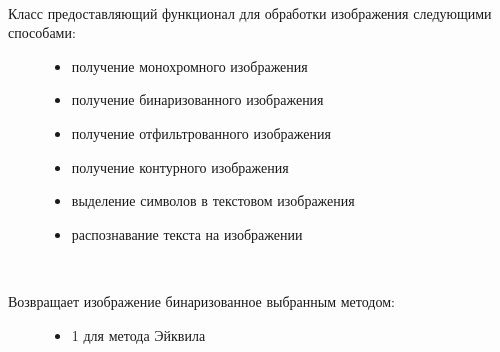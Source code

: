 \documentclass[letterpaper,10pt,russian]{sphinxmanual}
\begin{document}
\begin{fulllineitems}
\label{\detokenize{OCRImage:image.OCRImage}}~\begin{description}
\item[{Класс предоставляющий функционал для обработки изображения следующими способами:}] \leavevmode\begin{itemize}
\item {} 
 \textendash{} получение монохромного изображения

\item {} 
 \textendash{} получение бинаризованного изображения

\item {} 
 \textendash{} получение отфильтрованного изображения

\item {} 
 \textendash{} получение контурного изображения

\item {} 
 \textendash{} выделение символов в текстовом изображения

\item {} 
 \textendash{} распознавание текста на изображении

\end{itemize}

\end{description}

\begin{fulllineitems}
\label{\detokenize{OCRImage:image.OCRImage.get_binary_image}}~\begin{description}
\item[{Возвращает изображение бинаризованное выбранным методом:}] \leavevmode\begin{itemize}
\item {} 
1 \sphinxhyphen{} для метода Эйквила


\end{itemize}
\end{description}
\end{fulllineitems}
\end{fulllineitems}
\end{document}
